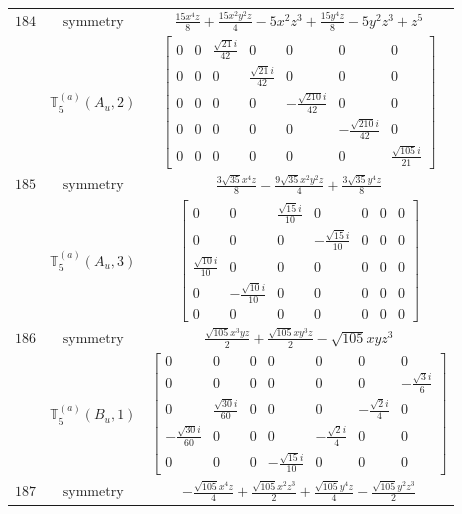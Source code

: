 \documentclass[fleqn,8pt,landscape]{jsarticle}
\begin{document}
\begin{longtable}{ccc}
$ 184 $ & $ \text{symmetry} $ & $ \frac{15 x^{4} z}{8} + \frac{15 x^{2} y^{2} z}{4} - 5 x^{2} z^{3} + \frac{15 y^{4} z}{8} - 5 y^{2} z^{3} + z^{5} $ \\
$  $ & $ \mathbb{T}_{5}^{(a)}(A_{u},2) $ & $ \begin{bmatrix} 0 & 0 & \frac{\sqrt{21} i}{42} & 0 & 0 & 0 & 0 \\ 0 & 0 & 0 & \frac{\sqrt{21} i}{42} & 0 & 0 & 0 \\ 0 & 0 & 0 & 0 & - \frac{\sqrt{210} i}{42} & 0 & 0 \\ 0 & 0 & 0 & 0 & 0 & - \frac{\sqrt{210} i}{42} & 0 \\ 0 & 0 & 0 & 0 & 0 & 0 & \frac{\sqrt{105} i}{21} \end{bmatrix} $ \\ \hline
$ 185 $ & $ \text{symmetry} $ & $ \frac{3 \sqrt{35} x^{4} z}{8} - \frac{9 \sqrt{35} x^{2} y^{2} z}{4} + \frac{3 \sqrt{35} y^{4} z}{8} $ \\
$  $ & $ \mathbb{T}_{5}^{(a)}(A_{u},3) $ & $ \begin{bmatrix} 0 & 0 & \frac{\sqrt{15} i}{10} & 0 & 0 & 0 & 0 \\ 0 & 0 & 0 & - \frac{\sqrt{15} i}{10} & 0 & 0 & 0 \\ \frac{\sqrt{10} i}{10} & 0 & 0 & 0 & 0 & 0 & 0 \\ 0 & - \frac{\sqrt{10} i}{10} & 0 & 0 & 0 & 0 & 0 \\ 0 & 0 & 0 & 0 & 0 & 0 & 0 \end{bmatrix} $ \\ \hline
$ 186 $ & $ \text{symmetry} $ & $ \frac{\sqrt{105} x^{3} y z}{2} + \frac{\sqrt{105} x y^{3} z}{2} - \sqrt{105} x y z^{3} $ \\
$  $ & $ \mathbb{T}_{5}^{(a)}(B_{u},1) $ & $ \begin{bmatrix} 0 & 0 & 0 & 0 & 0 & 0 & 0 \\ 0 & 0 & 0 & 0 & 0 & 0 & - \frac{\sqrt{3} i}{6} \\ 0 & \frac{\sqrt{30} i}{60} & 0 & 0 & 0 & - \frac{\sqrt{2} i}{4} & 0 \\ - \frac{\sqrt{30} i}{60} & 0 & 0 & 0 & - \frac{\sqrt{2} i}{4} & 0 & 0 \\ 0 & 0 & 0 & - \frac{\sqrt{15} i}{10} & 0 & 0 & 0 \end{bmatrix} $ \\ \hline
$ 187 $ & $ \text{symmetry} $ & $ - \frac{\sqrt{105} x^{4} z}{4} + \frac{\sqrt{105} x^{2} z^{3}}{2} + \frac{\sqrt{105} y^{4} z}{4} - \frac{\sqrt{105} y^{2} z^{3}}{2} $ \\

\end{longtable}
\end{document}
